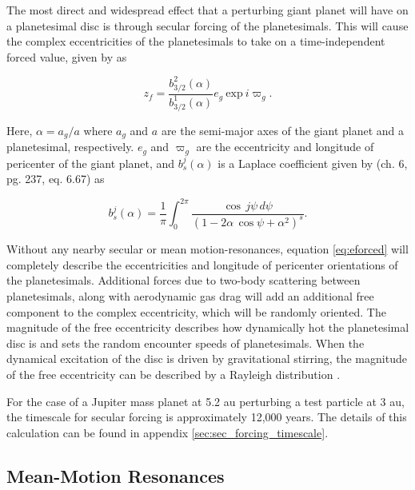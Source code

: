 \documentclass[fleqn,usenatbib]{mnras}
\begin{document}
The most direct and widespread effect that a perturbing giant planet will have on a planetesimal disc is through secular forcing of the planetesimals. This will 
cause the complex eccentricities of the planetesimals to take on a time-independent 
forced value, given by \citep{1999ApJ...527..918W} as

\begin{equation}\label{eq:eforced}
	z_{f} = \frac{b^{2}_{3/2} (\alpha)}{b^{1}_{3/2} (\alpha)} e_{g} ~ \mathrm{exp} ~ i \varpi_{g}.
\end{equation}

\noindent Here, $\alpha = a_{g} / a$ where $a_{g}$ and $a$ are the semi-major axes of the giant planet and a planetesimal, 
respectively. $e_{g}$ and $\varpi_{g}$ are the eccentricity and
longitude of pericenter of the giant planet, and $b^{j}_{s} (\alpha)$ is a 
Laplace coefficient given by \citep{1999ssd..book.....M} (ch. 6, pg. 237, eq. 6.67) as

\begin{equation}\label{eq:lap}
	b_{s}^{j}(\alpha) = \frac{1}{\pi} \int_{0}^{2 \pi} \frac{\cos \, j \psi \, d \psi}{\left( 1 - 2 \alpha \, \cos \psi + \alpha^2 \right)^{s}}.
\end{equation}

Without any nearby secular or mean motion-resonances, equation \ref{eq:eforced} will completely describe the eccentricities and longitude of  
pericenter orientations of the planetesimals. Additional forces due to two-body scattering between planetesimals, along with 
aerodynamic gas drag will add an additional free component to the complex eccentricity, which will be randomly oriented. The 
magnitude of the free eccentricity describes how dynamically hot the planetesimal disc is and sets the random encounter speeds of 
planetesimals. When the dynamical excitation of the disc is driven by gravitational stirring, the magnitude of the free eccentricity can 
be described by a Rayleigh distribution \citep{1992Icar...96..107I}.

For the case of a Jupiter mass planet at 5.2 au perturbing a test particle at 3 au, the timescale for secular forcing is approximately 12,000 years. The details of this calculation
can be found in appendix \ref{sec:sec_forcing_timescale}.

\subsection{Mean-Motion Resonances}\label{sec:mmr}
\end{document}
